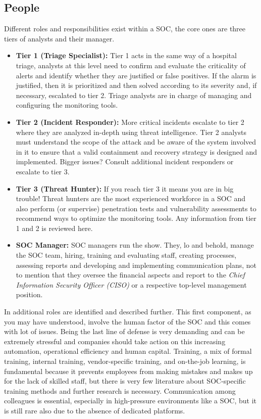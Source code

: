 \subsection{People}
Different roles and responsibilities exist within a SOC, the core ones are three tiers of analysts and their manager.
\begin{itemize}
    \item \textbf{Tier 1 (Triage Specialist):} Tier 1 acts in the same way of a hospital triage, analysts at this level need to confirm and evaluate the criticality of alerts and identify whether they are justified or false positives. If the alarm is justified, then it is prioritized and then solved according to its severity and, if necessary, escalated to tier 2. Triage analysts are in charge of managing and configuring the monitoring tools.
    \item \textbf{Tier 2 (Incident Responder):} More critical incidents escalate to tier 2 where they are analyzed in-depth using threat intelligence. Tier 2 analysts must understand the scope of the attack and be aware of the system involved in it to ensure that a valid containment and recovery strategy is designed and implemented. Bigger issues? Consult additional incident responders or escalate to tier 3.
    \item \textbf{Tier 3 (Threat Hunter):} If you reach tier 3 it means you are in big trouble! Threat hunters are the most experienced workforce in a SOC and also perform (or supervise) penetration tests and vulnerability assessments to recommend ways to optimize the monitoring tools. Any information from tier 1 and 2 is reviewed here.
    \item \textbf{SOC Manager:} SOC managers run the show. They, lo and behold, manage the SOC team, hiring, training and evaluating staff, creating processes, assessing reports and developing and implementing communication plans, not to mention that they oversee the financial aspects and report to the \textit{Chief Information Security Officer (CISO)} or a respective top-level management position.
\end{itemize}
In \cite{Vielberth2020} additional roles are identified and described further.\newline
This first component, as you may have understood, involve the human factor of the SOC and this comes with lot of issues. Being the last line of defense is very demanding and can be extremely stressful and companies should take action on this increasing automation, operational efficiency and human capital. Training, a mix of formal training, internal training, vendor-specific training, and on-the-job learning, is fundamental because it prevents employees from making mistakes and makes up for the lack of skilled staff, but there is very few literature about SOC-specific training methods and further research is necessary. Communication among colleagues is essential, especially in high-pressure environments like a SOC, but it is still rare also due to the absence of dedicated platforms.
